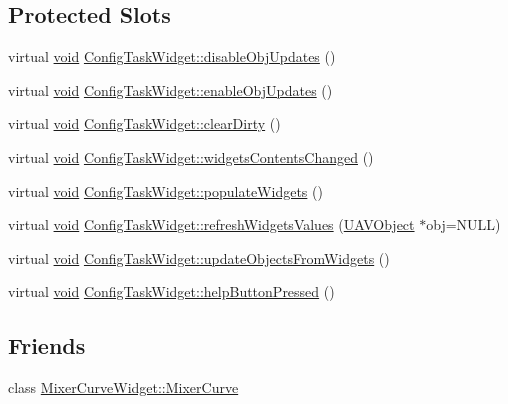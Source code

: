 \subsection*{\-Protected \-Slots}
\begin{DoxyCompactItemize}
\item 
virtual \hyperlink{group___u_a_v_objects_plugin_ga444cf2ff3f0ecbe028adce838d373f5c}{void} \hyperlink{group___u_a_v_object_widget_utils_ga32ef249bc6ebe47b9fe60812e09476da}{\-Config\-Task\-Widget\-::disable\-Obj\-Updates} ()
\item 
virtual \hyperlink{group___u_a_v_objects_plugin_ga444cf2ff3f0ecbe028adce838d373f5c}{void} \hyperlink{group___u_a_v_object_widget_utils_gafff7f205068866010a484ee95730b65b}{\-Config\-Task\-Widget\-::enable\-Obj\-Updates} ()
\item 
virtual \hyperlink{group___u_a_v_objects_plugin_ga444cf2ff3f0ecbe028adce838d373f5c}{void} \hyperlink{group___u_a_v_object_widget_utils_gae4dd854e5d93e1b268ffc473a7392493}{\-Config\-Task\-Widget\-::clear\-Dirty} ()
\item 
virtual \hyperlink{group___u_a_v_objects_plugin_ga444cf2ff3f0ecbe028adce838d373f5c}{void} \hyperlink{group___u_a_v_object_widget_utils_ga6860b8b666afa5a3254fd84ab1f9119e}{\-Config\-Task\-Widget\-::widgets\-Contents\-Changed} ()
\item 
virtual \hyperlink{group___u_a_v_objects_plugin_ga444cf2ff3f0ecbe028adce838d373f5c}{void} \hyperlink{group___u_a_v_object_widget_utils_gaa3d55f7941db619b9872b0ffdc78ebde}{\-Config\-Task\-Widget\-::populate\-Widgets} ()
\item 
virtual \hyperlink{group___u_a_v_objects_plugin_ga444cf2ff3f0ecbe028adce838d373f5c}{void} \hyperlink{group___u_a_v_object_widget_utils_ga7682451eb1e003d337c679fc8a36c6e1}{\-Config\-Task\-Widget\-::refresh\-Widgets\-Values} (\hyperlink{class_u_a_v_object}{\-U\-A\-V\-Object} $\ast$obj=\-N\-U\-L\-L)
\item 
virtual \hyperlink{group___u_a_v_objects_plugin_ga444cf2ff3f0ecbe028adce838d373f5c}{void} \hyperlink{group___u_a_v_object_widget_utils_ga4e59f88c43451ae4282077f9a9214cea}{\-Config\-Task\-Widget\-::update\-Objects\-From\-Widgets} ()
\item 
virtual \hyperlink{group___u_a_v_objects_plugin_ga444cf2ff3f0ecbe028adce838d373f5c}{void} \hyperlink{group___u_a_v_object_widget_utils_ga63ae96f50a8ed78f60d382dede4676d7}{\-Config\-Task\-Widget\-::help\-Button\-Pressed} ()
\end{DoxyCompactItemize}
\subsection*{\-Friends}
\begin{DoxyCompactItemize}
\item 
class \hyperlink{group___u_a_v_object_widget_utils_ga4dec7e6867bf4ed62c5309f7149f0dd0}{\-Mixer\-Curve\-Widget\-::\-Mixer\-Curve}
\end{DoxyCompactItemize}



